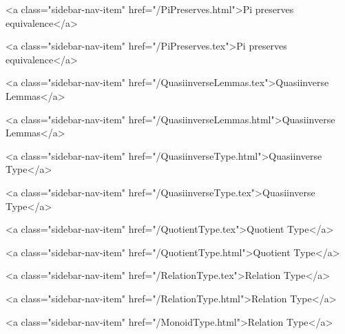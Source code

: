       
        
          <a class="sidebar-nav-item" href="/PiPreserves.html">Pi preserves equivalence</a>
        
      
    
      
        
          <a class="sidebar-nav-item" href="/PiPreserves.tex">Pi preserves equivalence</a>
        
      
    
      
        
          <a class="sidebar-nav-item" href="/QuasiinverseLemmas.tex">Quasiinverse Lemmas</a>
        
      
    
      
        
          <a class="sidebar-nav-item" href="/QuasiinverseLemmas.html">Quasiinverse Lemmas</a>
        
      
    
      
        
          <a class="sidebar-nav-item" href="/QuasiinverseType.html">Quasiinverse Type</a>
        
      
    
      
        
          <a class="sidebar-nav-item" href="/QuasiinverseType.tex">Quasiinverse Type</a>
        
      
    
      
        
          <a class="sidebar-nav-item" href="/QuotientType.tex">Quotient Type</a>
        
      
    
      
        
          <a class="sidebar-nav-item" href="/QuotientType.html">Quotient Type</a>
        
      
    
      
        
          <a class="sidebar-nav-item" href="/RelationType.tex">Relation Type</a>
        
      
    
      
        
          <a class="sidebar-nav-item" href="/RelationType.html">Relation Type</a>
        
      
    
      
        
          <a class="sidebar-nav-item" href="/MonoidType.html">Relation Type</a>
        
